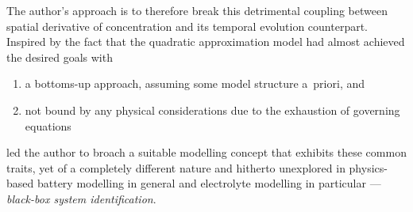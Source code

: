 The author's  approach is to  therefore break this detrimental  coupling between
spatial  derivative of  concentration  and its  temporal evolution  counterpart.
Inspired by the fact that the  quadratic approximation model had almost achieved
the desired goals with
\begin{enumerate}[label=\emph{\alph*})]
    \item a bottoms-up approach, \ie{} assuming some model structure a~priori, and
    \item not bound by any physical considerations due to the exhaustion of governing equations
\end{enumerate}
led  the author  to  broach a  suitable modelling  concept  that exhibits  these
common  traits, yet  of a  completely different  nature and  hitherto unexplored
in  physics-based battery  modelling  in general  and  electrolyte modelling  in
particular --- \emph{black-box system identification}.

